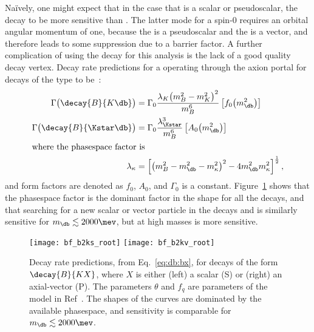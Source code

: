 Na\"{i}vely, one might expect that in the case that \db is a scalar or pseudoscalar, the decay
\decay{\Bd}{\Kp\mumu} to be more sensitive than \btokstrmumu.
The latter mode for a spin-0 \db requires an orbital angular momentum of one, because the \Bd is a
pseudoscalar and the \Kstarz is a vector, and therefore leads to some suppression due to a barrier
factor.
A further complication of using the decay \decay{\Bp}{\Kp\mumu} for this analysis is the lack of a
good quality \Bd decay vertex.
Decay rate predictions for a \db operating through the axion portal for decays of the type
 to be~\cite{Batell:2009jf}:
\begin{align}
  \Gamma\big(\decay{B}{K\db}\big) &= \Gamma_0
  \frac{\lambda_{K}\big(m_{B}^2-m_{K}^2\big)^2}{m_{B}^6}
  \left[f_0\!\left(m_\db^2\right)\right]
  \\
  \Gamma\big(\decay{B}{\Kstar\db}\big) &= \Gamma_0
  \frac{\lambda_{\Kstar}^3}{m_{B}^6}
  \left[A_0\!\left(m_\db^2\right)\right]
  \\
  \intertext{where the phasespace factor is}
  \lambda_\kappa &= \left[
    \left( m_B^2 - m_\db^2 - m_\kappa^2 \right)^2
    -4m_\db^2m_\kappa^2
    \right]^\frac12,
    \label{eq:db:bx}
\end{align}
and form factors are denoted as $f_0$, $A_0$, and $\Gamma_0$  is a constant.
Figure~\ref{fig:db:kx} shows that the phasespace factor is the dominant factor in the shape for all
the decays, and that searching for a new scalar or vector particle in the decays
\decay{\Bd}{\Kstarz\db} and \decay{\Bp}{\Kp\db} is similarly sensitive for $m_\db\lesssim2000\mev$,
but at high masses \decay{\Bp}{\Kp\db} is more sensitive.

\begin{figure}
  \begin{center}
    \texttt{[image: bf\_b2ks\_root]}
    \texttt{[image: bf\_b2kv\_root]}
    \caption[Decay rates for decays of the form ]
    {
      Decay rate predictions, from Eq.~\protect\ref{eq:db:bx},
      for decays of the form $\decay{B}{KX}$, where $X$ is either
      (left) a scalar (S) or
      (right) an axial-vector (P).
      The parameters $\theta$ and $f_q$ are parameters of the model in
      Ref~\cite{Batell:2009jf}.
      The shapes of the curves are dominated by the available phasespace, and sensitivity is
      comparable for $m_\db\lesssim2000\mev$.
    }
    \label{fig:db:kx}
  \end{center}
\end{figure}



